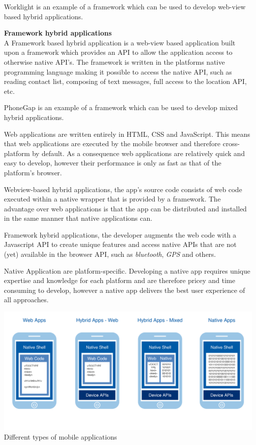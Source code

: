 Worklight is an example of a framework which can be used to develop web-view based hybrid applications.

{\bf Framework hybrid applications}\\
A Framework based hybrid application is a web-view based application built upon a framework which provides an API to allow the application access to otherwise native API's. The framework is written in the platforms native programming language making it possible to access the native API, such as reading contact list, composing of text messages, full access to the location API, etc.

PhoneGap is an example of a framework which can be used to develop mixed hybrid applications.

Web applications are written entirely in HTML, CSS and JavaScript. This means that web applications are executed by the mobile browser and therefore cross-platform by default. As a consequence web applications are relatively quick and easy to develop, however their performance is only as fast as that of the platform's browser.

Webview-based hybrid applications, the app's source code consists of web code executed within a native wrapper that is provided by a framework. The advantage over web applications is that the app can be distributed and installed in the same manner that native applications can.
 
Framework hybrid applications, the developer augments the web code with a Javascript API to create unique features and
access native APIs that are not (yet) available in the browser API, such as \emph{bluetooth}, \emph{GPS} and others.
 
Native Application are platform-specific. Developing a native app requires unique expertise and knowledge for each platform and are therefore pricey and time consuming to develop, however a native app delivers the best user experience of all approaches.

\begin{centering}
\includegraphics[scale=0.7]{images/apptypesdefined.png}\\{Different types of mobile applications\cite{IBM-Worklight2012}}\\
\end{centering}

